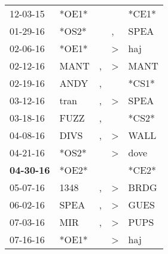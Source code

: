 \begin{supertabular}{p{0.07\textwidth}p{0.06\textwidth}p{0.02\textwidth}p{0.02\textwidth}p{0.06\textwidth}}
          12-03-15\textsuperscript{} &                            *OE1* &                  &                  &                            *CE1* \\
          01-29-16\textsuperscript{} &                            *OS2* &                  &                , &           SPEA\textsuperscript{} \\
          02-06-16\textsuperscript{} &                            *OE1* &                  &     \textgreater &            haj\textsuperscript{} \\
          02-12-16\textsuperscript{} &           MANT\textsuperscript{} &                , &     \textgreater &           MANT\textsuperscript{} \\
          02-19-16\textsuperscript{} &           ANDY\textsuperscript{} &                , &                  &                            *CS1* \\
          03-12-16\textsuperscript{} &           tran\textsuperscript{} &                , &     \textgreater &           SPEA\textsuperscript{} \\
          03-18-16\textsuperscript{} &           FUZZ\textsuperscript{} &                , &                  &                            *CS2* \\
          04-08-16\textsuperscript{} &           DIVS\textsuperscript{} &                , &     \textgreater &           WALL\textsuperscript{} \\
          04-21-16\textsuperscript{} &                            *OS2* &                  &     \textgreater &           dove\textsuperscript{} \\
 \textbf{04-30-16\textsuperscript{}} &                            *OE2* &                  &                  &                            *CE2* \\
          05-07-16\textsuperscript{} &           1348\textsuperscript{} &                , &     \textgreater &           BRDG\textsuperscript{} \\
          06-02-16\textsuperscript{} &           SPEA\textsuperscript{} &                , &     \textgreater &           GUES\textsuperscript{} \\
          07-03-16\textsuperscript{} &            MIR\textsuperscript{} &                , &     \textgreater &           PUPS\textsuperscript{} \\
          07-16-16\textsuperscript{} &                            *OE1* &                  &     \textgreater &            haj\textsuperscript{} \\

\end{supertabular}
